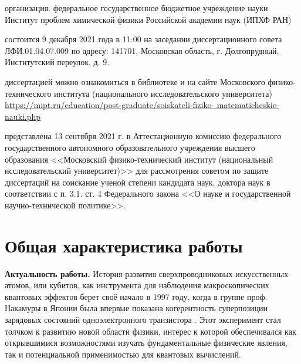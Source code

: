 \documentclass[14pt, a4paper]{extarticle}
\begin{document}
\vspace{1.5cm}
 организация: федеральное государственное бюджетное учреждение науки Институт проблем химической физики Российской академии наук (ИПХФ РАН)

\vspace{1.5cm}
 состоится 9 декабря 2021 года в 11:00 на заседании диссертационного совета ЛФИ.01.04.07.009 по адресу: 141701, Московская область, г. Долгопрудный, Институтский переулок, д. 9.

\vspace{1.5cm}
 диссертацией можно ознакомиться в библиотеке и на сайте Московского физико-технического института (национального исследовательского университета) \url{https://mipt.ru/education/post-graduate/soiskateli-fiziko- matematicheskie-nauki.php}

\vspace{1.5cm}
 представлена 13 сентября 2021 г. в Аттестационную комиссию федерального государственного автономного образовательного учреждения высшего образования <<Московский физико-технический институт (национальный исследовательский университет)>> для рассмотрения советом по защите диссертаций на соискание ученой степени кандидата наук, доктора наук в соответствии с п. 3.1. ст. 4 Федерального закона <<О науке и государственной научно-технической политике>>.

\section*{Общая характеристика работы}

\textbf{Актуальность работы.} История развития сверхпроводниковых искусственных атомов, или кубитов, как инструмента для наблюдения макроскопических квантовых эффектов берет своё начало в 1997 году, когда в группе проф. Накамуры в Японии была впервые показана когерентность суперпозиции зарядовых состояний одноэлектронного транзистора \cite{nakamura1997spectroscopy}. Этот эксперимент стал толчком к развитию новой области физики, интерес к которой обеспечивался как открывшимися возможностями изучать фундаментальные физические явления, так и потенциальной применимостью для квантовых вычислений.
\end{document}
